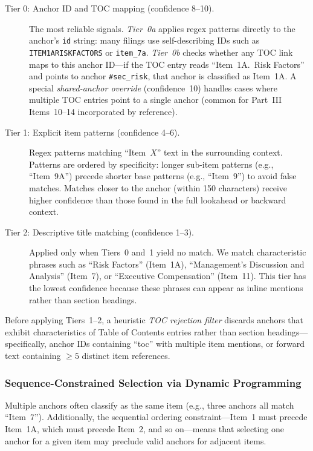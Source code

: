 \documentclass[12pt,letterpaper,oneside]{article}
\begin{document}
\begin{description}
  \item[Tier 0: Anchor ID and TOC mapping (confidence 8--10).]
    The most reliable signals. \emph{Tier~0a} applies regex patterns
    directly to the anchor's \texttt{id} string: many filings use
    self-describing IDs such as \texttt{ITEM1ARISKFACTORS} or
    \texttt{item\_7a}. \emph{Tier~0b} checks whether any TOC link
    maps to this anchor ID---if the TOC entry reads ``Item~1A.~Risk
    Factors'' and points to anchor \texttt{\#sec\_risk}, that anchor
    is classified as Item~1A. A special \emph{shared-anchor override}
    (confidence~10) handles cases where multiple TOC entries point to
    a single anchor (common for Part~III Items~10--14 incorporated by
    reference).

  \item[Tier 1: Explicit item patterns (confidence 4--6).]
    Regex patterns matching ``Item~$X$'' text in the surrounding
    context. Patterns are ordered by specificity: longer sub-item
    patterns (e.g., ``Item~9A'') precede shorter base patterns
    (e.g., ``Item~9'') to avoid false matches. Matches closer to the
    anchor (within 150 characters) receive higher confidence than
    those found in the full lookahead or backward context.

  \item[Tier 2: Descriptive title matching (confidence 1--3).]
    Applied only when Tiers~0 and~1 yield no match. We match
    characteristic phrases such as ``Risk Factors'' (Item~1A),
    ``Management's Discussion and Analysis'' (Item~7), or
    ``Executive Compensation'' (Item~11). This tier has the lowest
    confidence because these phrases can appear as inline mentions
    rather than section headings.
\end{description}

\noindent Before applying Tiers~1--2, a heuristic \emph{TOC rejection
filter} discards anchors that exhibit characteristics of Table of
Contents entries rather than section headings---specifically, anchor
IDs containing ``toc'' with multiple item mentions, or forward text
containing $\geq 5$ distinct item references.

\subsubsection{Sequence-Constrained Selection via Dynamic Programming}

Multiple anchors often classify as the same item (e.g., three anchors
all match ``Item~7''). Additionally, the sequential ordering
constraint---Item~1 must precede Item~1A, which must precede Item~2,
and so on---means that selecting one anchor for a given item may
preclude valid anchors for adjacent items.
\end{document}
